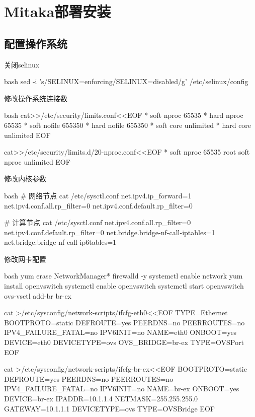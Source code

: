 \chapter{Mitaka部署安装}

\section{配置操作系统}
\label{section:system_configuration}
\begin{outline}[enumerate]

\1 关闭selinux
\begin{code-block}{bash}
sed -i 's/SELINUX=enforcing/SELINUX=disabled/g' /etc/selinux/config
\end{code-block}

\1 修改操作系统连接数
\begin{code-block}{bash}
cat>>/etc/security/limits.conf<<EOF
*               soft    nproc           65535
*               hard    nproc           65535
*               soft    nofile          655350
*               hard    nofile          655350
*               soft    core            unlimited
*               hard    core            unlimited
EOF

cat>>/etc/security/limits.d/20-nproc.conf<<EOF
*          soft    nproc     65535
root       soft    nproc     unlimited
EOF
\end{code-block}

\1 修改内核参数
\begin{code-block}{bash}
# 网络节点
cat /etc/sysctl.conf
net.ipv4.ip_forward=1
net.ipv4.conf.all.rp_filter=0
net.ipv4.conf.default.rp_filter=0

# 计算节点
cat /etc/sysctl.conf
net.ipv4.conf.all.rp_filter=0
net.ipv4.conf.default.rp_filter=0
net.bridge.bridge-nf-call-iptables=1
net.bridge.bridge-nf-call-ip6tables=1
\end{code-block}

\1 修改网卡配置
\begin{code-block}{bash}
yum erase NetworkManager* firewalld -y
systemctl enable network
yum install openvswitch
systemctl enable openvswitch
systemctl start openvswitch
ovs-vsctl add-br br-ex

cat >/etc/sysconfig/network-scripts/ifcfg-eth0<<EOF
TYPE=Ethernet
BOOTPROTO=static
DEFROUTE=yes
PEERDNS=no
PEERROUTES=no
IPV4_FAILURE_FATAL=no
IPV6INIT=no
NAME=eth0
ONBOOT=yes
DEVICE=eth0
DEVICETYPE=ovs
OVS_BRIDGE=br-ex
TYPE=OVSPort
EOF

cat >/etc/sysconfig/network-scripts/ifcfg-br-ex<<EOF
BOOTPROTO=static
DEFROUTE=yes
PEERDNS=no
PEERROUTES=no
IPV4_FAILURE_FATAL=no
IPV6INIT=no
NAME=br-ex
ONBOOT=yes
DEVICE=br-ex
IPADDR=10.1.1.4
NETMASK=255.255.255.0
GATEWAY=10.1.1.1
DEVICETYPE=ovs
TYPE=OVSBridge
EOF


\end{code-block}
\end{outline}
